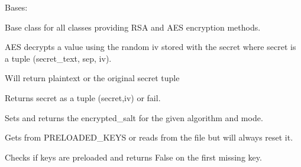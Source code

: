 \documentclass[letterpaper,10pt,english]{sphinxmanual}
\begin{document}

\begin{fulllineitems}
\label{base_classes:bhp_crypto.classes.Cryptor}
Bases: 

Base class for all classes providing RSA and AES encryption methods.

\begin{fulllineitems}
\label{base_classes:bhp_crypto.classes.Cryptor.aes_decrypt}
AES decrypts a value using the random iv stored with the secret where
secret is a tuple (secret\_text, sep, iv).

Will return plaintext or the original secret tuple

\end{fulllineitems}


\begin{fulllineitems}
\label{base_classes:bhp_crypto.classes.Cryptor.aes_encrypt}
Returns secret as a tuple (secret,iv) or fail.

\end{fulllineitems}


\begin{fulllineitems}
\label{base_classes:bhp_crypto.classes.Cryptor.get_encrypted_salt}
Sets and returns the encrypted\_salt for the given algorithm and mode.

Gets from PRELOADED\_KEYS or reads from the file but will always reset it.

\end{fulllineitems}


\begin{fulllineitems}
\label{base_classes:bhp_crypto.classes.Cryptor.is_preloaded_with_keys}
Checks if keys are preloaded and returns False on the first missing key.


\end{fulllineitems}
\end{fulllineitems}
\end{document}
